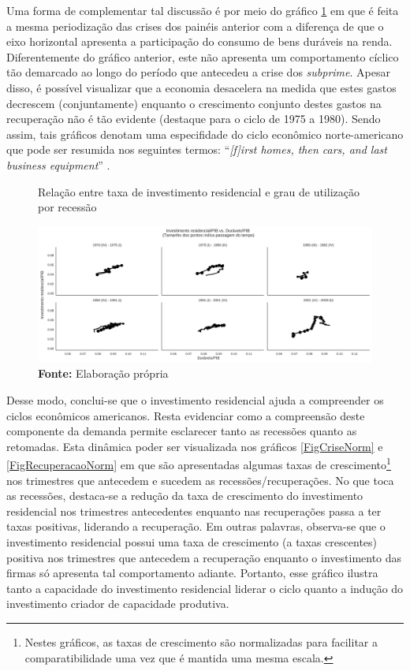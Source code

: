 
Uma forma de complementar tal discussão é por meio do gráfico \ref{FigInvesto_Duraveis} em que é feita a mesma periodização das crises dos painéis anterior com a diferença de que o eixo horizontal apresenta a participação do consumo de bens duráveis na renda. Diferentemente do gráfico anterior, este não apresenta um comportamento cíclico tão demarcado ao longo do período que antecedeu a crise dos \textit{subprime}. Apesar disso, é possível visualizar que a economia desacelera na medida que estes gastos decrescem (conjuntamente) enquanto o crescimento conjunto destes gastos na recuperação não é tão evidente (destaque para o ciclo de 1975 a 1980).
Sendo assim, tais gráficos denotam uma especifidade do ciclo econômico norte-americano que pode ser resumida nos seguintes termos: ``\textit{[f]irst homes, then cars, and last business equipment}'' \cite[p.~8]{leamer_housing_2007}.

\begin{figure}[H]
	\centering
	\caption{Relação entre taxa de investimento residencial e grau de utilização por recessão}
	\label{FigInvesto_Duraveis}
	\includegraphics[width=\textwidth]{../../Dados/Fatos_Estilizados/figs/Ciclo_Ih_Duraveis.png}
	\caption*{\textbf{Fonte:} Elaboração própria}
\end{figure}

Desse modo, conclui-se que o investimento residencial ajuda a compreender os ciclos econômicos americanos.
Resta evidenciar como a compreensão deste componente da demanda permite esclarecer tanto as recessões quanto as retomadas. Esta dinâmica poder ser visualizada nos gráficos \ref{FigCriseNorm} e \ref{FigRecuperacaoNorm} em que são apresentadas algumas taxas de crescimento\footnote{Nestes gráficos, as taxas de crescimento são normalizadas para facilitar a comparatibilidade uma vez que é mantida uma mesma escala.} nos trimestres que antecedem e sucedem as recessões/recuperações. 
No que toca as recessões, destaca-se a redução da taxa de crescimento do investimento residencial nos trimestres antecedentes enquanto nas recuperações passa a ter taxas positivas, liderando a recuperação.
Em outras palavras, observa-se que o investimento residencial possui uma taxa de crescimento (a taxas crescentes) positiva nos trimestres que antecedem a recuperação enquanto o investimento das firmas só apresenta tal comportamento adiante. Portanto, esse gráfico ilustra tanto a capacidade do investimento residencial liderar o ciclo quanto a indução do investimento criador de capacidade produtiva.


